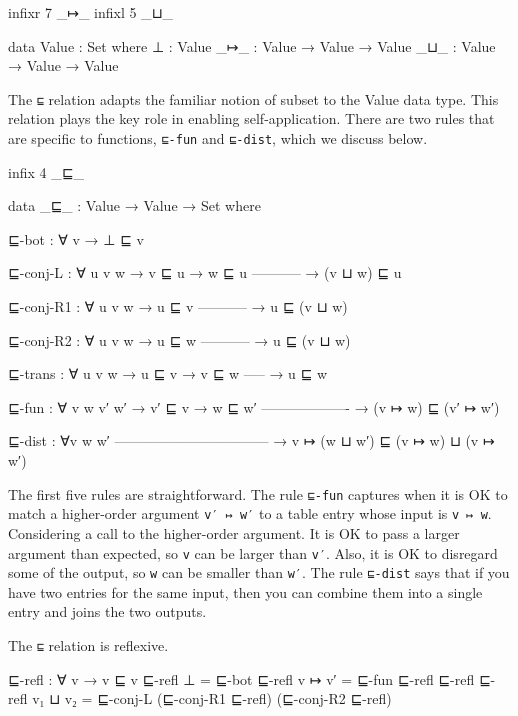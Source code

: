\begin{fence}
\begin{code}
infixr 7 _↦_
infixl 5 _⊔_

data Value : Set where
  ⊥ : Value
  _↦_ : Value → Value → Value
  _⊔_ : Value → Value → Value
\end{code}
\end{fence}

The \texttt{⊑} relation adapts the familiar notion of subset to the
Value data type. This relation plays the key role in enabling
self-application. There are two rules that are specific to functions,
\texttt{⊑-fun} and \texttt{⊑-dist}, which we discuss below.

\begin{fence}
\begin{code}
infix 4 _⊑_

data _⊑_ : Value → Value → Set where

  ⊑-bot : ∀ {v} → ⊥ ⊑ v

  ⊑-conj-L : ∀ {u v w}
    → v ⊑ u
    → w ⊑ u
      -----------
    → (v ⊔ w) ⊑ u

  ⊑-conj-R1 : ∀ {u v w}
    → u ⊑ v
      -----------
    → u ⊑ (v ⊔ w)

  ⊑-conj-R2 : ∀ {u v w}
    → u ⊑ w
      -----------
    → u ⊑ (v ⊔ w)

  ⊑-trans : ∀ {u v w}
    → u ⊑ v
    → v ⊑ w
      -----
    → u ⊑ w

  ⊑-fun : ∀ {v w v′ w′}
    → v′ ⊑ v
    → w ⊑ w′
      -------------------
    → (v ↦ w) ⊑ (v′ ↦ w′)

  ⊑-dist : ∀{v w w′}
      ---------------------------------
    → v ↦ (w ⊔ w′) ⊑ (v ↦ w) ⊔ (v ↦ w′)
\end{code}
\end{fence}

The first five rules are straightforward. The rule \texttt{⊑-fun}
captures when it is OK to match a higher-order argument
\texttt{v′\ ↦\ w′} to a table entry whose input is \texttt{v\ ↦\ w}.
Considering a call to the higher-order argument. It is OK to pass a
larger argument than expected, so \texttt{v} can be larger than
\texttt{v′}. Also, it is OK to disregard some of the output, so
\texttt{w} can be smaller than \texttt{w′}. The rule \texttt{⊑-dist}
says that if you have two entries for the same input, then you can
combine them into a single entry and joins the two outputs.

The \texttt{⊑} relation is reflexive.

\begin{fence}
\begin{code}
⊑-refl : ∀ {v} → v ⊑ v
⊑-refl {⊥} = ⊑-bot
⊑-refl {v ↦ v′} = ⊑-fun ⊑-refl ⊑-refl
⊑-refl {v₁ ⊔ v₂} = ⊑-conj-L (⊑-conj-R1 ⊑-refl) (⊑-conj-R2 ⊑-refl)
\end{code}
\end{fence}

